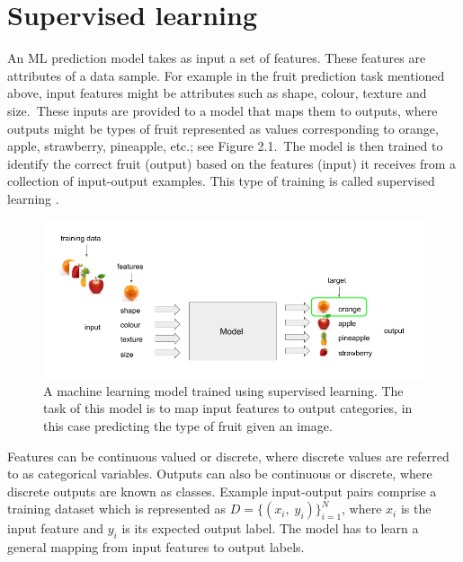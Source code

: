 
\section{Supervised learning}

An ML prediction model takes as input a set of features. These features are attributes of a data sample. For example in the fruit prediction task mentioned above, input features might be attributes such as shape, colour, texture and size.\ These inputs are provided to a model that maps them to outputs, where outputs might be types of fruit represented as values corresponding to orange, apple, strawberry, pineapple, etc.; see Figure 2.1.\ The model is then trained to identify the correct fruit (output) based on the features (input) it receives from a collection of input-output examples. This type of training is called supervised learning \citep{bishop2006pattern}.

\begin{figure}[H]
   	\centering
    	\includegraphics[width=1.0\textwidth, height=0.4\textwidth]{supervised_learning}
	\captionsetup{justification=centering}
	\caption{A machine learning model trained using supervised learning. The task of this model is to map input features to output categories, in this case predicting the type of fruit given an image.}
\end{figure}

\noindent Features can be continuous valued or discrete, where discrete values are referred to as categorical variables. Outputs can also be continuous or discrete, where discrete outputs are known as classes. Example input-output pairs comprise a training dataset which is represented as \begin{math} D = \{(x_i, \; y_i)\}_{i=1}^N \end{math}, where \begin{math} x_i \end{math} is the input feature and \begin{math} y_i \end{math} is its expected output label. The model has to learn a general mapping from input features to output labels. \par

